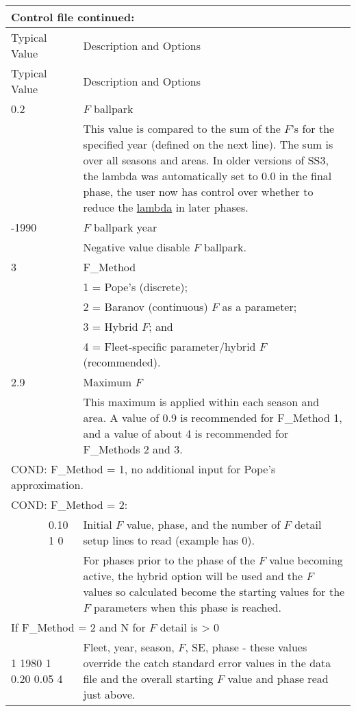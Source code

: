 \begin{longtable}{p{1cm} p{3cm} p{11cm}}
	\multicolumn{3}{l}{Control file continued:} \\
	\hline
	\multicolumn{2}{l}{Typical Value} & Description and Options \Tstrut\Bstrut\\
	\hline
	\endfirsthead

	\hline
	\multicolumn{2}{l}{Typical Value} & Description and Options \Tstrut\Bstrut\\
	\hline
	\endhead

	\hline
	\endfoot
	\endlastfoot

	0.2 \Tstrut & & $F$ ballpark \\
		& & This value is compared to the sum of the $F$'s for the specified year (defined on the next line). The sum is over all seasons and areas. In older versions of SS3, the lambda was automatically set to 0.0 in the final phase, the user now has control over whether to reduce the \hyperlink{Lambdas}{lambda} in later phases. \Bstrut\\
	\hline

	-1990\Tstrut & & $F$ ballpark year \\
		& & Negative value disable $F$ ballpark. \Bstrut\\
	\hline

	3 \Tstrut & & F\_Method \\
	   & & 1 = Pope's (discrete); \\
	   & & 2 = Baranov (continuous) $F$ as a parameter; \\
	   & & 3 = Hybrid $F$; and \\
	   & & 4 = Fleet-specific parameter/hybrid $F$ (recommended). \Bstrut\\
	\hline

	2.9 \Tstrut & & Maximum $F$ \\
	 & & This maximum is applied within each season and area. A value of 0.9 is recommended for F\_Method 1, and a value of about 4 is recommended for F\_Methods 2 and 3. \Bstrut\\
	\hline

	\multicolumn{3}{l}{COND: F\_Method = 1, no additional input for Pope's approximation.} \Tstrut\Bstrut\\
	\hline

	\multicolumn{3}{l}{COND: F\_Method = 2:} \Tstrut\\
	& 0.10 1 0 & Initial $F$ value, phase, and the number of $F$ detail setup lines to read (example has 0). \\
	&  & For phases prior to the phase of the $F$ value becoming active, the hybrid option will be used and the $F$ values so calculated become the starting values for the $F$ parameters when this phase is reached. \\
	\multicolumn{3}{l}{If F\_Method = 2 and N for $F$ detail is > 0} \Tstrut\\
	\multicolumn{2}{l}{1 1980 1 0.20 0.05 4} & Fleet, year, season, $F$, SE, phase - these values override the catch standard error values in the data file and the overall starting $F$ value and phase read just above. \Bstrut\\
	\hline


\end{longtable}
